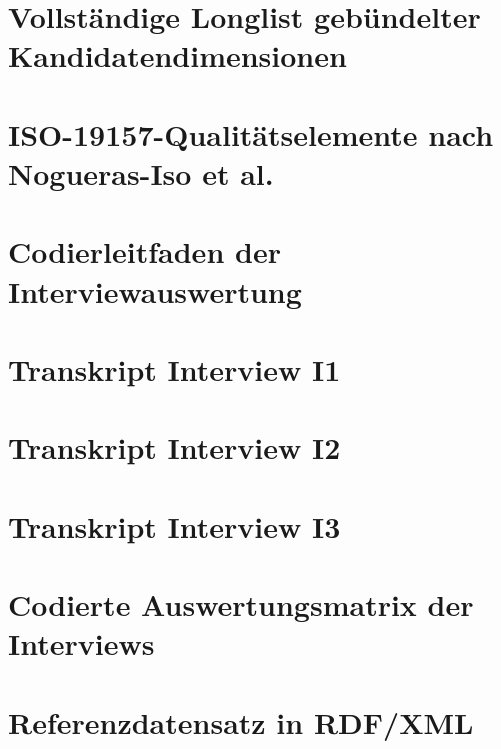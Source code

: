 \documentclass[german]{htwg-report}
\begin{document}
\chapter{Vollständige Longlist gebündelter Kandidatendimensionen}
\label{app:longlist_kandidatendimensionen}


\chapter{ISO-19157-Qualitätselemente nach Nogueras-Iso et al.}
\label{app:iso19157_qualitaetselemente}


\chapter{Codierleitfaden der Interviewauswertung}
\label{app:kodierleitfaden}


\chapter{Transkript Interview I1}
\label{app:transkript_i1}


\chapter{Transkript Interview I2}
\label{app:transkript_i2}


\chapter{Transkript Interview I3}
\label{app:transkript_i3}


\chapter{Codierte Auswertungsmatrix der Interviews}
\label{app:kodierte_auswertungsmatrix}


\chapter{Referenzdatensatz in RDF/XML}
\label{app:referenzdatensatz}

\end{document}

